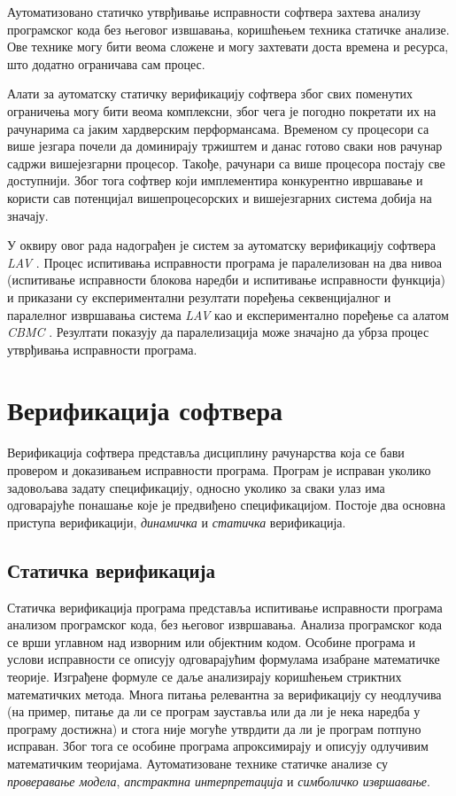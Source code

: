 \documentclass[12pt,oneside]{memoir}
\begin{document}
 Аутоматизовано статичко утврђивање исправности софтвера захтева анализу програмског кода без његовог извшавања, коришћењем техника статичке анализе. Ове технике могу бити веома сложене и могу захтевати доста времена и ресурса, што додатно ограничава сам процес.

 Алати за аутоматску статичку верификацију софтвера због свих поменутих ограничења могу бити веома комплексни, због чега је погодно покретати их на рачунарима са јаким хардверским перформансама. Временом су процесори са више језгара почели да доминирају тржиштем и данас готово сваки нов рачунар садржи вишејезгарни процесор. Такође, рачунари са више процесора постају све доступнији. Због тога софтвер који имплементира конкурентно ивршавање и користи сав потенцијал вишепроцесорских и вишејезгарних система добија на значају.
 
 У оквиру овог рада надограђен је систем за аутоматску верификацију софтвера \textit{LAV} \cite{mvjphd}. Процес испитивања исправности програма је паралелизован на два нивоа (испитивање исправности блокова наредби и испитивање исправности функција) и приказани су експериментални резултати поређења секвенцијалног и паралелног извршавања система \textit{LAV} као и експериментално поређење са алатом \textit{CBMC} \cite{cbmc}. Резултати показују да паралелизација може значајно да убрза процес утврђивања исправности програма.



\chapter{Верификација софтвера}
	Верификација софтвера представља дисциплину рачунарства која се бави провером и доказивањем исправности програма. Програм је исправан уколико задовољава задату спецификацију, односно уколико за сваки улаз има одговарајуће понашање које је предвиђено спецификацијом. Постоје два основна приступа верификацији, \textit{динамичка} и \textit{статичка} верификација.
  
  
  \section{Статичка верификација}
  \label{statver}
  Статичка верификација програма представља испитивање исправности програма анализом програмског кода, без његовог извршавања. Анализа програмског кода се врши углавном над изворним или објектним кодом. Особине програма и услови исправности се описују одговарајућим формулама изабране математичке теорије. Изграђене формуле се даље анализирају коришћењем стриктних математичких метода. Многа питања релевантна за верификацију су неодлучива (на пример, питање да ли се програм зауставља или да ли је нека наредба у програму достижна) и стога није могуће утврдити да ли је програм потпуно исправан. Због тога се особине програма апроксимирају и описују одлучивим математичким теоријама. Аутоматизоване технике статичке анализе су \textit{проверавање модела}, \textit{апстрактна интерпретација} и \textit{симболичко извршавање}.  
  
\end{document}
